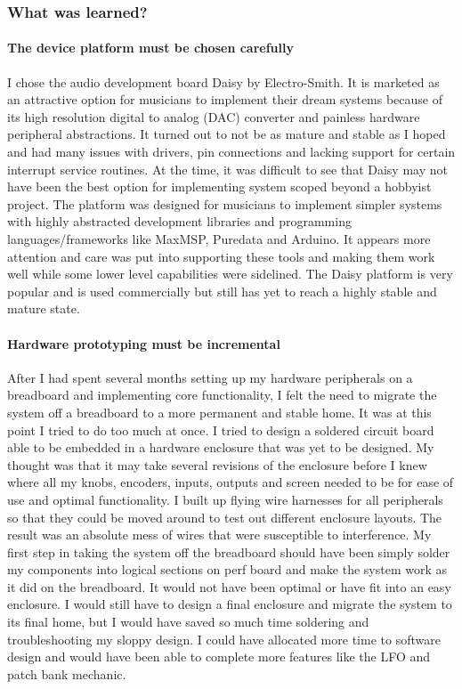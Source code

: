 \documentclass[acmlarge,screen]{acmart}
\begin{document}
	\subsubsection{What was learned?}
	
	\paragraph{The device platform must be chosen carefully} I chose the audio development board Daisy by Electro-Smith. It is marketed as an attractive option for musicians to implement their dream systems because of its high resolution digital to analog (DAC) converter and painless hardware peripheral abstractions. It turned out to not be as mature and stable as I hoped and had many issues with drivers, pin connections and lacking support for certain interrupt service routines. At the time, it was difficult to see that Daisy may not have been the best option for implementing system scoped beyond a hobbyist project. The platform was designed for musicians to implement simpler systems with highly abstracted development libraries and programming languages/frameworks like MaxMSP, Puredata and Arduino. It appears more attention and care was put into supporting these tools and making them work well while some lower level capabilities were sidelined. The Daisy platform is very popular and is used commercially but still has yet to reach a highly stable and mature state.
	
	\paragraph{Hardware prototyping must be incremental} After I had spent several months setting up my hardware peripherals on a breadboard and implementing core functionality, I felt the need to migrate the system off a breadboard to a more permanent and stable home. It was at this point I tried to do too much at once. I tried to design a soldered circuit board able to be embedded in a hardware enclosure that was yet to be designed. My thought was that it may take several revisions of the enclosure before I knew where all my knobs, encoders, inputs, outputs and screen needed to be for ease of use and optimal functionality. I built up flying wire harnesses for all peripherals so that they could be moved around to test out different enclosure layouts. The result was an absolute mess of wires that were susceptible to interference. My first step in taking the system off the breadboard should have been simply solder my components into logical sections on perf board and make the system work as it did on the breadboard. It would not have been optimal or have fit into an easy enclosure. I would still have to design a final enclosure and migrate the system to its final home, but I would have saved so much time soldering and troubleshooting my sloppy design. I could have allocated more time to software design and would have been able to complete more features like the LFO and patch bank mechanic.
	
\end{document}

